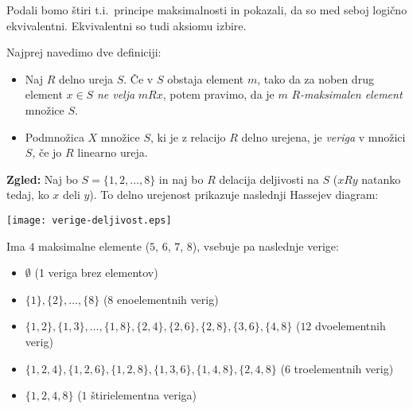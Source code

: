 \documentclass[11pt,paper=b5,footinclude,headinclude]{scrbook} %
\begin{document}
Podali bomo štiri t.i.~principe maksimalnosti in pokazali, da so med seboj logično ekvivalentni. Ekvivalentni so tudi aksiomu izbire.

\bigskip

Najprej navedimo dve definiciji:

\begin{itemize}
  \item Naj $R$ delno ureja $S$. Če v $S$ obstaja element $m$, tako da za noben drug element $x\in S$ {\em ne velja} $mRx$, potem pravimo, da je $m$ {\em $R$-maksimalen element} množice $S$.

  \item Podmnožica $X$ množice $S$, ki je z relacijo $R$ delno urejena, je {\em veriga} v množici $S$, če jo $R$ linearno ureja.
\end{itemize}



\medskip

\textbf{Zgled:}
Naj bo $S = \{1,2,\ldots, 8\}$ in naj bo $R$ delacija deljivosti na $S$ ($xRy$ natanko tedaj, ko $x$ deli $y$).
To delno urejenost prikazuje naslednji Hassejev diagram:

\medskip
\begin{center}
\texttt{[image: verige-deljivost.eps]}
\end{center}

Ima $4$ maksimalne elemente ($5$, $6$, $7$, $8$), vsebuje pa naslednje verige:
\begin{itemize}
  \item $\emptyset$ (1 veriga brez elementov)
  \item $\{1\}, \{2\}, \ldots, \{8\}$  ($8$ enoelementnih verig)
  \item $\{1,2\}, \{1,3\},\ldots, \{1,8\},\{2,4\}, \{2,6\}, \{2,8\}, \{3,6\}, \{4,8\}$  ($12$ dvoelementnih verig)
  \item $\{1,2,4\}, \{1,2,6\}, \{1,2,8\},\{1,3,6\},\{1,4,8\}, \{2,4,8\}$  ($6$ troelementnih verig)
  \item $\{1,2,4,8\}$  ($1$ štirielementna veriga)
\end{itemize}
\end{document}
